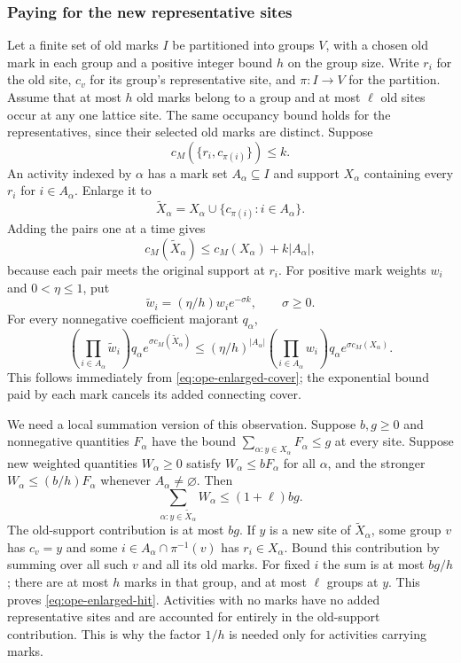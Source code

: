 \subsubsection{Paying for the new representative sites}
Let a finite set of old marks $I$ be partitioned into groups $V$,
with a chosen old mark in each group and a positive integer bound $h$
on the group size. Write $r_i$ for the old site,
$c_v$ for its group's representative site, and $\pi:I\to V$ for the
partition. Assume that at most $h$ old marks belong to a group and
at most $\ell$ old sites occur at any one lattice site. The same
occupancy bound holds for the representatives, since their selected
old marks are distinct. Suppose
\[
 c_M(\{r_i,c_{\pi(i)}\})\leq k.
\]
An activity indexed by $\alpha$ has a mark set $A_\alpha\subseteq I$
and support $X_\alpha$ containing every $r_i$ for $i\in A_\alpha$.
Enlarge it to
\[
 \widetilde X_\alpha=X_\alpha\cup
              \{c_{\pi(i)}:i\in A_\alpha\}.
\]
Adding the pairs one at a time gives
\begin{equation}\label{eq:ope-enlarged-cover}
 c_M(\widetilde X_\alpha)
       \leq c_M(X_\alpha)+k|A_\alpha|,
\end{equation}
because each pair meets the original support at $r_i$.
For positive mark weights $w_i$ and $0<\eta\leq1$, put
\[
 \widetilde w_i=(\eta/h)w_i e^{-\sigma k},\qquad \sigma\geq0.
\]
For every nonnegative coefficient majorant $q_\alpha$,
\begin{equation}\label{eq:ope-enlargement-price}
 \left(\prod_{i\in A_\alpha}\widetilde w_i\right)q_\alpha
 e^{\sigma c_M(\widetilde X_\alpha)}
 \leq (\eta/h)^{|A_\alpha|}
 \left(\prod_{i\in A_\alpha}w_i\right)q_\alpha
 e^{\sigma c_M(X_\alpha)}.
\end{equation}
This follows immediately from \eqref{eq:ope-enlarged-cover}; the
exponential bound paid by each mark cancels its added connecting cover.

We need a local summation version of this observation. Suppose $b,g\geq0$ and
nonnegative quantities $F_\alpha$ have the bound
$\sum_{\alpha:y\in X_\alpha}F_\alpha\leq g$ at every site.
Suppose new weighted quantities $W_\alpha\geq0$ satisfy
$W_\alpha\leq bF_\alpha$ for all $\alpha$, and the stronger
$W_\alpha\leq(b/h)F_\alpha$ whenever $A_\alpha\ne\varnothing$.
Then
\begin{equation}\label{eq:ope-enlarged-hit}
 \sum_{\alpha:y\in\widetilde X_\alpha}W_\alpha
       \leq(1+\ell)bg.
\end{equation}
The old-support contribution is at most $bg$. If $y$ is a new site
of $\widetilde X_\alpha$, some group $v$ has $c_v=y$ and some
$i\in A_\alpha\cap\pi^{-1}(v)$ has $r_i\in X_\alpha$.
Bound this contribution by summing over all such $v$ and all its old
marks. For fixed $i$ the sum is at most $bg/h$; there are at most
$h$ marks in that group, and at most $\ell$ groups at $y$.
This proves \eqref{eq:ope-enlarged-hit}. Activities with no marks
have no added representative sites and are accounted for entirely
in the old-support contribution. This is why the factor $1/h$ is
needed only for activities carrying marks.


